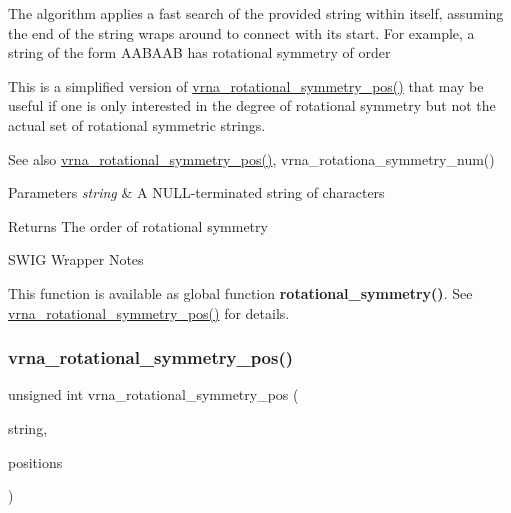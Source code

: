 The algorithm applies a fast search of the provided string within itself, assuming the end of the string wraps around to connect with it\textquotesingle{}s start. For example, a string of the form {\ttfamily A\+A\+B\+A\+AB} has rotational symmetry of order {} 

This is a simplified version of \hyperlink{group__combinatorics__utils_ga294d48935fcac87ab335d771fe289ecb}{vrna\+\_\+rotational\+\_\+symmetry\+\_\+pos()} that may be useful if one is only interested in the degree of rotational symmetry but not the actual set of rotational symmetric strings.

\begin{DoxySeeAlso}{See also}
\hyperlink{group__combinatorics__utils_ga294d48935fcac87ab335d771fe289ecb}{vrna\+\_\+rotational\+\_\+symmetry\+\_\+pos()}, vrna\+\_\+rotationa\+\_\+symmetry\+\_\+num()
\end{DoxySeeAlso}

\begin{DoxyParams}{Parameters}
{\em string} & A N\+U\+L\+L-\/terminated string of characters \\
\hline
\end{DoxyParams}
\begin{DoxyReturn}{Returns}
The order of rotational symmetry
\end{DoxyReturn}
\begin{DoxyRefDesc}{S\+W\+I\+G Wrapper Notes}
\item[\hyperlink{wrappers__wrappers000006}{S\+W\+I\+G Wrapper Notes}]This function is available as global function {\bfseries rotational\+\_\+symmetry()}. See \hyperlink{group__combinatorics__utils_ga294d48935fcac87ab335d771fe289ecb}{vrna\+\_\+rotational\+\_\+symmetry\+\_\+pos()} for details. \end{DoxyRefDesc}
\mbox{\label{group__combinatorics__utils_ga294d48935fcac87ab335d771fe289ecb}} 
\subsubsection{\texorpdfstring{vrna\+\_\+rotational\+\_\+symmetry\+\_\+pos()}{vrna\_rotational\_symmetry\_pos()}}
{\footnotesize\ttfamily unsigned int vrna\+\_\+rotational\+\_\+symmetry\+\_\+pos (\begin{DoxyParamCaption}\item[{const char $\ast$}]{string,  }\item[{unsigned int $\ast$$\ast$}]{positions }\end{DoxyParamCaption})}



